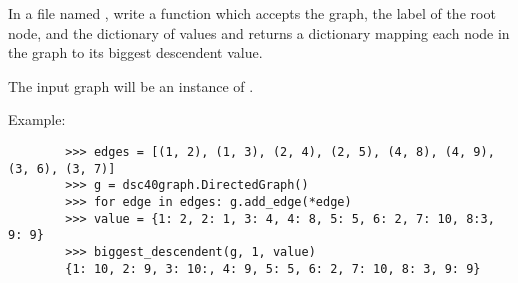 \begin{progprob}
    In a file named ,
    write a function  which accepts
    the graph, the label of the root node, and the dictionary of values and returns
    a dictionary mapping each node in the graph to its biggest descendent value.

    The input graph will be an instance of .

    Example:

    \begin{verbatim}
        >>> edges = [(1, 2), (1, 3), (2, 4), (2, 5), (4, 8), (4, 9), (3, 6), (3, 7)]
        >>> g = dsc40graph.DirectedGraph()
        >>> for edge in edges: g.add_edge(*edge)
        >>> value = {1: 2, 2: 1, 3: 4, 4: 8, 5: 5, 6: 2, 7: 10, 8:3, 9: 9}
        >>> biggest_descendent(g, 1, value)
        {1: 10, 2: 9, 3: 10:, 4: 9, 5: 5, 6: 2, 7: 10, 8: 3, 9: 9}
    \end{verbatim}

    \begin{soln}
    \end{soln}
\end{progprob}

